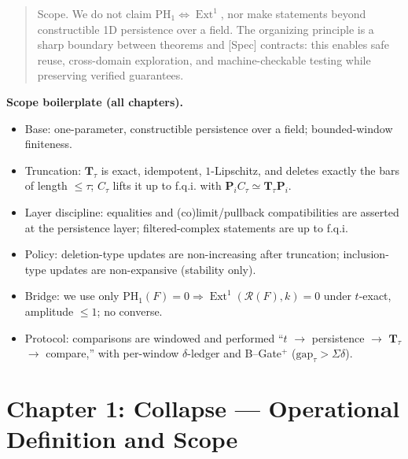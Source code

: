 \documentclass[11pt]{article}
\DeclareMathOperator{\Ext}{Ext}
\numberwithin{equation}{section}
\theoremstyle{definition}
\begin{document}
\begin{abstract}
Scope.
We do not claim \(\mathrm{PH}_1 \Leftrightarrow \Ext^1\), nor make statements beyond constructible 1D persistence over a field.
The organizing principle is a sharp boundary between theorems and [Spec] contracts: this enables safe reuse, cross-domain exploration, and machine-checkable testing while preserving verified guarantees.
\end{abstract}

\medskip
\noindent\textbf{Scope boilerplate (all chapters).}\label{boilerplate:scope}
\begin{itemize}
  \item Base: one-parameter, constructible persistence over a field; bounded-window finiteness.
  \item Truncation: \(\mathbf{T}_\tau\) is exact, idempotent, \(1\)-Lipschitz, and deletes exactly the bars of length \(\le \tau\); \(C_\tau\) lifts it up to f.q.i. with \(\mathbf{P}_i C_\tau \simeq \mathbf{T}_\tau \mathbf{P}_i\).
  \item Layer discipline: equalities and (co)limit/pullback compatibilities are asserted at the persistence layer; filtered-complex statements are up to f.q.i.
  \item Policy: deletion-type updates are non-increasing after truncation; inclusion-type updates are non-expansive (stability only).
  \item Bridge: we use only \(\mathrm{PH}_1(F)=0 \Rightarrow \Ext^1(\mathcal{R}(F),k)=0\) under \(t\)-exact, amplitude \(\le 1\); no converse.
  \item Protocol: comparisons are windowed and performed “\(t\) \(\to\) persistence \(\to\) \(\mathbf{T}_\tau\) \(\to\) compare,” with per-window \(\delta\)-ledger and B--Gate\(^{+}\) (\(\mathrm{gap}_\tau>\Sigma\delta\)).
\end{itemize}



\section{Chapter 1: Collapse — Operational Definition and Scope}
\end{document}

